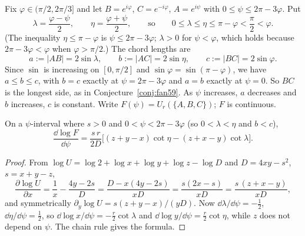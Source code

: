 Fix $\varphi\in(\pi/2,2\pi/3]$ and let $B=e^{i\varphi}$, $C=e^{-i\varphi}$, $A=e^{i\psi}$ with $0\le\psi\le 2\pi-3\varphi$. Put
\[
\lambda=\frac{\varphi-\psi}{2},\qquad \eta=\frac{\varphi+\psi}{2},\qquad\text{so}\qquad 0\le\lambda\le\eta\le\pi-\varphi<\frac\pi2<\varphi .
\]
(The inequality $\eta\le\pi-\varphi$ is $\psi\le2\pi-3\varphi$; $\lambda>0$ for $\psi<\varphi$, which holds because $2\pi-3\varphi<\varphi$ when $\varphi>\pi/2$.) The chord lengths are
\[
a:=|AB|=2\sin\lambda,\qquad b:=|AC|=2\sin\eta,\qquad c:=|BC|=2\sin\varphi .
\]
Since $\sin$ is increasing on $[0,\pi/2]$ and $\sin\varphi=\sin(\pi-\varphi)$, we have $a\le b\le c$, with $b=c$ exactly at $\psi=2\pi-3\varphi$ and $a=b$ exactly at $\psi=0$. So $BC$ is the longest side, as in Conjecture~\ref{conj:fan59}. As $\psi$ increases, $a$ decreases and $b$ increases, $c$ is constant. Write $F(\psi)=U_r(\{A,B,C\})$; $F$ is continuous.

\begin{lemma}[derivative]\label{lem:deriv}
On a $\psi$-interval where $s>0$ and $0<\psi<2\pi-3\varphi$ (so $0<\lambda<\eta$ and $b<c$),
\[
\frac{\dd\log F}{\dd\psi}=\frac{s\,r}{2D}\Big[(z+y-x)\cot\eta-(z+x-y)\cot\lambda\Big].
\]
\end{lemma}
\begin{proof}
From $\log U=\log2+\log x+\log y+\log z-\log D$ and $D=4xy-s^2$, $s=x+y-z$,
\[
\frac{\partial\log U}{\partial x}=\frac1x-\frac{4y-2s}{D}=\frac{D-x(4y-2s)}{xD}=\frac{s(2x-s)}{xD}=\frac{s\,(z+x-y)}{xD},
\]
and symmetrically $\partial_y\log U=s(z+y-x)/(yD)$. Now $\dd\lambda/\dd\psi=-\tfrac12$, $\dd\eta/\dd\psi=\tfrac12$, so $\dd\log x/\dd\psi=-\tfrac r2\cot\lambda$ and $\dd\log y/\dd\psi=\tfrac r2\cot\eta$, while $z$ does not depend on $\psi$. The chain rule gives the formula.
\end{proof}

